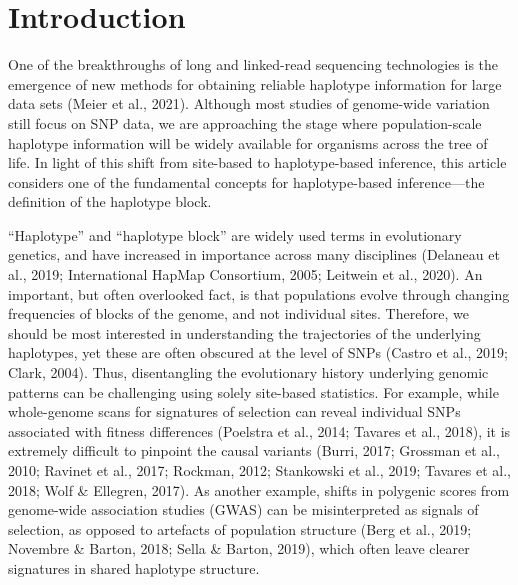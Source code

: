 \documentclass[twocolumn]{bmcart}%
\begin{document}


\section*{Introduction}

One of the breakthroughs of long and linked-read sequencing technologies is the emergence of new methods for obtaining reliable haplotype information for large data sets (Meier et al., 2021). Although most studies of genome-wide variation still focus on SNP data, we are approaching the stage where population-scale haplotype information will be widely available for organisms across the tree of life. In light of this shift from site-based to haplotype-based inference, this article considers one of the fundamental concepts for haplotype-based inference—the definition of the haplotype block.

“Haplotype” and “haplotype block” are widely used terms in evolutionary genetics, and have increased in importance across many disciplines (Delaneau et al., 2019; International HapMap Consortium, 2005; Leitwein et al., 2020). An important, but often overlooked fact, is that populations evolve through changing frequencies of blocks of the genome, and not individual sites. Therefore, we should be most interested in understanding the trajectories of the underlying haplotypes, yet these are often obscured at the level of SNPs (Castro et al., 2019; Clark, 2004). Thus, disentangling the evolutionary history underlying genomic patterns can be challenging using solely site-based statistics. For example, while whole-genome scans for signatures of selection can reveal individual SNPs associated with fitness differences (Poelstra et al., 2014; Tavares et al., 2018), it is extremely difficult to pinpoint the causal variants (Burri, 2017; Grossman et al., 2010; Ravinet et al., 2017; Rockman, 2012; Stankowski et al., 2019; Tavares et al., 2018; Wolf \& Ellegren, 2017). As another example, shifts in polygenic scores from genome-wide association studies (GWAS) can be misinterpreted as signals of selection, as opposed to artefacts of population structure (Berg et al., 2019; Novembre \& Barton, 2018; Sella \& Barton, 2019), which often leave clearer signatures in shared haplotype structure. 
\end{document}
